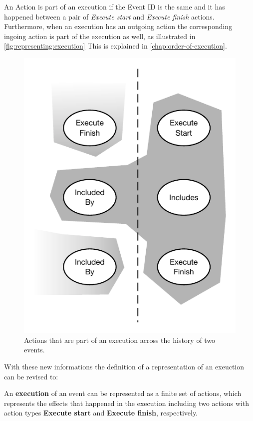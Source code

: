     \newpar
    An Action is part of an execution if the Event ID is the same and it has happened between a pair of \textit{Execute start} and \textit{Execute finish} actions. Furthermore, when an execution has an outgoing action the corresponding ingoing action is part of the execution as well, as illustrated in \autoref{fig:representing:execution} This is explained in \autoref{chap:order-of-execution}.
    
    \begin{figure}[H]
		\centering
		\includegraphics[height=0.35\textheight]{3local/images/execution.pdf}
		\caption{Actions that are part of an execution across the history of two events.}
		\label{fig:representing:execution}
	\end{figure}
    
	With these new informations the definition of a representation of an exeuction can be revised to:
	
	\begin{definition}
		An \textbf{execution} of an event can be represented as a finite set of actions, which represents the effects that happened in the execution including two actions with action types \textbf{Execute start} and \textbf{Execute finish}, respectively.
		\label{def:execution}
	\end{definition}
	
